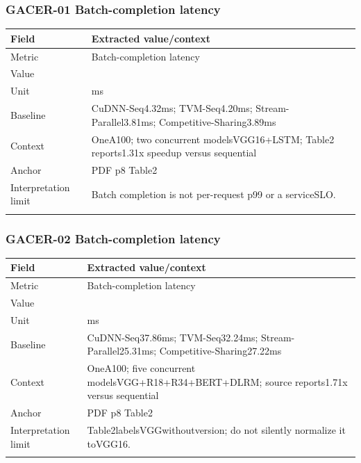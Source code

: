 \subsubsection*{GACER-01 Batch-completion latency}
\begin{longtable}{>{\raggedright\arraybackslash}p{}>{\raggedright\arraybackslash}p{}}
\toprule
\textbf{Field} & \textbf{Extracted value/context}\\\midrule\endhead
Metric & Batch-completion latency\\\addlinespace
Value & 3.3\\\addlinespace
Unit & ms\\\addlinespace
Baseline & CuDNN-Seq4.32ms;\allowbreak{} TVM-Seq4.20ms;\allowbreak{} Stream-Parallel3.81ms;\allowbreak{} Competitive-Sharing3.89ms\\\addlinespace
Context & OneA100;\allowbreak{} two concurrent modelsVGG16+LSTM;\allowbreak{} Table2 reports1.31x speedup versus sequential\\\addlinespace
Anchor & PDF p8 Table2\\\addlinespace
Interpretation limit & Batch completion is not per-request p99 or a serviceSLO.\\\addlinespace
\bottomrule\end{longtable}
\subsubsection*{GACER-02 Batch-completion latency}
\begin{longtable}{>{\raggedright\arraybackslash}p{}>{\raggedright\arraybackslash}p{}}
\toprule
\textbf{Field} & \textbf{Extracted value/context}\\\midrule\endhead
Metric & Batch-completion latency\\\addlinespace
Value & 22.14\\\addlinespace
Unit & ms\\\addlinespace
Baseline & CuDNN-Seq37.86ms;\allowbreak{} TVM-Seq32.24ms;\allowbreak{} Stream-Parallel25.31ms;\allowbreak{} Competitive-Sharing27.22ms\\\addlinespace
Context & OneA100;\allowbreak{} five concurrent modelsVGG+R18+R34+BERT+DLRM;\allowbreak{} source reports1.71x versus sequential\\\addlinespace
Anchor & PDF p8 Table2\\\addlinespace
Interpretation limit & Table2labelsVGGwithoutversion;\allowbreak{} do not silently normalize it toVGG16.\\\addlinespace
\bottomrule\end{longtable}
